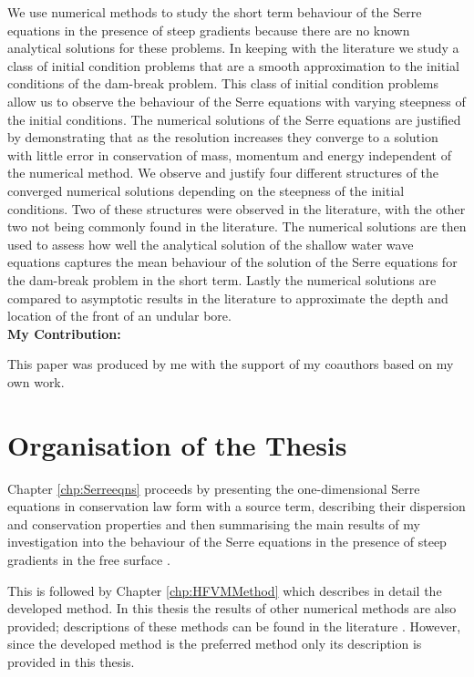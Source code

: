  We use numerical methods to study the short term behaviour of the Serre equations in
 the presence of steep gradients because there are no known analytical solutions for these
 problems. In keeping with the literature we study a class of initial condition problems that
 are a smooth approximation to the initial conditions of the dam-break problem. This class
 of initial condition problems allow us to observe the behaviour of the Serre equations
 with varying steepness of the initial conditions. The numerical solutions of the Serre
 equations are justified by demonstrating that as the resolution increases they converge
 to a solution with little error in conservation of mass, momentum and energy independent
 of the numerical method. We observe and justify four different structures of the converged
 numerical solutions depending on the steepness of the initial conditions. Two of these
 structures were observed in the literature, with the other two not being commonly found
 in the literature. The numerical solutions are then used to assess how well the analytical
 solution of the shallow water wave equations captures the mean behaviour of the solution
 of the Serre equations for the dam-break problem in the short term. Lastly the numerical
 solutions are compared to asymptotic results in the literature to approximate the depth
 and location of the front of an undular bore. \\
 \textbf{My Contribution:}
 
 This paper was produced by me with the support of my coauthors based on my own work.

\section{Organisation of the Thesis}
Chapter \ref{chp:Serreeqns} proceeds by presenting the one-dimensional Serre equations in conservation law form with a source term, describing their dispersion and conservation properties and then summarising the main results of my investigation into the behaviour of the Serre equations in the presence of steep gradients in the free surface \cite{Pitt-2018-61}.

This is followed by Chapter \ref{chp:HFVMMethod} which describes in detail the developed method. In this thesis the results of other numerical methods are also provided; descriptions of these methods can be found in the literature \cite{Zoppou-etal-2017,Pitt-2018-61}. However, since the developed method is the preferred method only its description is provided in this thesis. 


